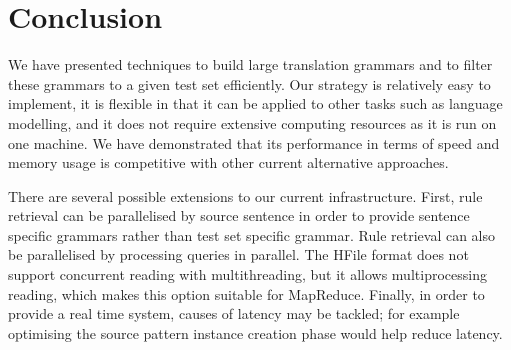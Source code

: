 \section{Conclusion}
\label{sec:conclusion}

We have presented techniques to build large translation
grammars and to filter these grammars to a given test set efficiently.
Our strategy is relatively easy to implement, it is
flexible in that it can be applied to other tasks such as language modelling,
and it does not require extensive computing resources as it is run on one
machine. We have demonstrated that its performance in terms of speed and memory
usage is competitive with other current alternative approaches.

There are several possible extensions to our current infrastructure.
First, rule retrieval can be parallelised by source sentence in order %
to provide sentence specific grammars rather than test set specific
grammar. Rule retrieval can also be parallelised by
processing queries in parallel. The HFile format does not support
concurrent reading with multithreading, but it allows multiprocessing
reading, which makes this option suitable for MapReduce.
Finally, in order to provide a real time system, causes of latency
may be tackled; for example optimising the source pattern instance
creation phase would help reduce latency.
